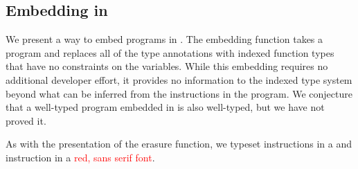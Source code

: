 \subsection{Embedding \wasm in \name}
\label{subsec:embedding}
We present a way to embed \wasm programs in \name.
The embedding function takes a \wasm program and replaces all of the type annotations with indexed function types that have no constraints on the variables.
While this embedding requires no additional developer effort, it provides no information to the indexed type system beyond what can be inferred from the instructions in the program.
We conjecture that a well-typed \wasm program embedded in \name is also well-typed, but we have not proved it.

As with the presentation of the erasure function, we typeset \name instructions in a  and \wasm instruction in a \textcolor{red}{\textsf{red, sans serif font}}.

